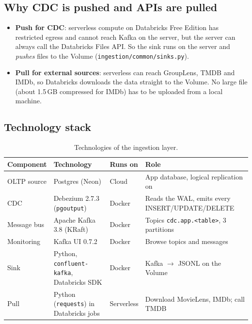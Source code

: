 \documentclass[12pt,a4paper]{article}
\newcommand{\code}[1]{\texttt{#1}}
\begin{document}
\subsection{Why CDC is pushed and APIs are pulled}
\begin{itemize}
  \item \textbf{Push for CDC}: serverless compute on Databricks Free Edition has restricted egress and cannot reach
        Kafka on the server, but the server can always call the Databricks Files API. So the sink runs on the server
        and \emph{pushes} files to the Volume (\code{ingestion/common/sinks.py}).
  \item \textbf{Pull for external sources}: serverless can reach GroupLens, TMDB and IMDb, so Databricks downloads the
        data straight to the Volume. No large file (about 1.5\,GB compressed for IMDb) has to be uploaded from a
        local machine.
\end{itemize}

\subsection{Technology stack}
\begin{table}[H]
\centering\small
\begin{tabularx}{\textwidth}{@{}lllX@{}}
\toprule
Component & Technology & Runs on & Role \\
\midrule
OLTP source & Postgres (Neon) & Cloud & App database, logical replication on \\
CDC & Debezium 2.7.3 (\code{pgoutput}) & Docker & Reads the WAL, emits every INSERT/UPDATE/DELETE \\
Message bus & Apache Kafka 3.8 (KRaft) & Docker & Topics \code{cdc.app.<table>}, 3 partitions \\
Monitoring & Kafka UI 0.7.2 & Docker & Browse topics and messages \\
Sink & Python, \code{confluent-kafka}, Databricks SDK & Docker & Kafka $\rightarrow$ JSONL on the Volume \\
Pull & Python (\code{requests}) in Databricks jobs & Serverless & Download MovieLens, IMDb; call TMDB \\
\bottomrule
\end{tabularx}
\caption{Technologies of the ingestion layer.}
\end{table}
\end{document}
